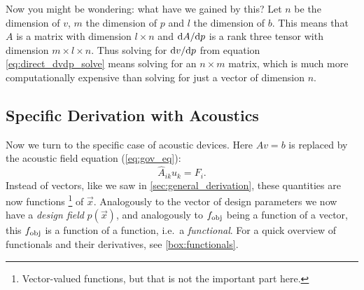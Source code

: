 Now you might be wondering: what have we gained by this?
Let $n$ be the dimension of $v$, $m$ the dimension of $p$ and $l$ the dimension
of $b$.
This means that $A$ is a matrix with dimension $l\times n$ and $\difs{A}{p}$ is
a rank three tensor with dimension $m\times l\times n$.
Thus solving for $\difs{v}{p}$ from equation \cref{eq:direct_dvdp_solve}
means solving for an $n \times m$ matrix, which is much more computationally
expensive than solving for just a vector of dimension $n$.

\subsection{Specific Derivation with Acoustics}\label{sec:spec_der}

Now we turn to the specific case of acoustic devices.
Here $A v = b$ is replaced by the acoustic field equation (\cref{eq:gov_eq}):
\begin{equation}\label{eq:sim_eq}
	\hat A_{ik} u_k = F_i.
\end{equation}
Instead of vectors, like we saw in \cref{sec:general_derivation}, these quantities are now functions%
\footnote{%
	Vector-valued functions, but that is not the important part here.
}
of $\vec x$.
Analogously to the vector of design parameters we now have a \emph{design field}
$p(\vec x)$,
and analogously to $f_\text{obj}$ being a function of a vector, this $f_\text{obj}$ is a
function of a function, i.e.\ a \emph{functional}.
For a quick overview of functionals and their derivatives, see
\cref{box:functionals}.

